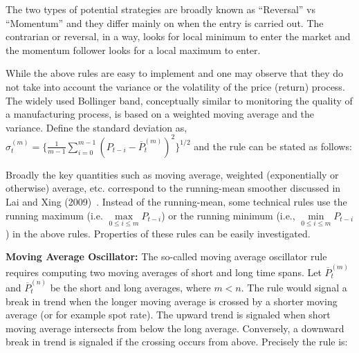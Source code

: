 The two types of potential strategies are broadly known as ``Reversal'' vs ``Momentum'' and they differ mainly on when the entry is carried out. The contrarian or reversal, in a way, looks for local minimum to enter the market and the momentum follower looks for a local maximum to enter.


While the above rules are easy to implement and one may observe that they do not take into account the variance or the volatility of the price (return) process. The widely used Bollinger band, conceptually similar to monitoring the quality of a manufacturing process, is based on a weighted moving average and the variance. Define the standard deviation as, $\hat{\sigma}_{t}^{(m)} = \{ \frac{1}{m-1} \sum_{i=0}^{m-1} (P_{t-i} - \overline{P}_{t}^{(m)})^2 \}^{1/2}$ and the rule can be stated as follows: \twomedskip


\noindent{} \twomedskip


Broadly the key quantities such as moving average, weighted (exponentially or otherwise) average, etc. correspond to the running-mean smoother discussed in Lai and Xing (2009)~\cite[Section 7.2.1]{lai1}. Instead of the running-mean, some technical rules use the running maximum (i.e. $\max\limits_{0 \leq i \leq m} P_{t-i}$) or the running minimum (i.e., $\min\limits_{0 \leq i \leq m} P_{t-i}$) in the above rules. Properties of these rules can be easily investigated. \twomedskip


\noindent\textbf{Moving Average Oscillator:} The so-called moving average oscillator rule requires computing two moving averages of short and long time spans. Let $\overline{P}_{t}^{(m)}$ and $\overline{P}_{t}^{(n)}$ be the short and long averages, where $m< n$. The rule would signal a break in trend when the longer moving average is crossed by a shorter moving average (or for example spot rate). The upward trend is signaled when short moving average intersects from below the long average. Conversely, a downward break in trend is signaled if the crossing occurs from above. Precisely the rule is: \twomedskip


\noindent{} \twomedskip


